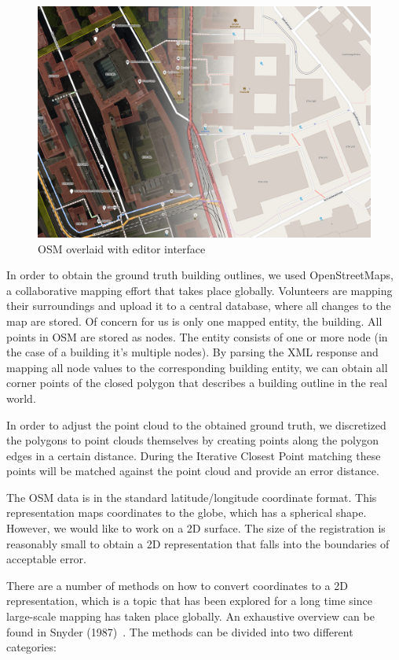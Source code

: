 \documentclass[10pt,twocolumn,letterpaper]{article}
\begin{document}
\begin{figure}[h]
   \centering
   \includegraphics[width=\linewidth]{images/osm_map.png}
   \caption{OSM overlaid with editor interface}
   \label{fig:figure1}
\end{figure}


In order to obtain the ground truth building outlines, we used OpenStreetMaps, a collaborative mapping effort that takes place globally. Volunteers are mapping their surroundings and upload it to a central database, where all changes to the map are stored. 
Of concern for us is only one mapped entity, the building. All points in OSM are stored as nodes. The entity consists of one or more node (in the case of a building it's multiple nodes). By parsing the XML response and mapping all node values to the corresponding building entity, we can obtain all corner points of the closed polygon that describes a building outline in the real world.

In order to adjust the point cloud to the obtained ground truth, we discretized the polygons to point clouds themselves by creating points along the polygon edges in a certain distance. During the Iterative Closest Point matching these points will be matched against the point cloud and provide an error distance.

The OSM data is in the standard latitude/longitude coordinate format. This representation maps coordinates to the globe, which has a spherical shape. However, we would like to work on a 2D surface. The size of the registration is reasonably small to obtain a 2D representation that falls into the boundaries of acceptable error.

There are a number of methods on how to convert coordinates to a 2D representation, which is a topic that has been explored for a long time since large-scale mapping has taken place globally. An exhaustive overview can be found in Snyder (1987)~\cite{Snyder1987}. The methods can be divided into two different categories:
\end{document}
